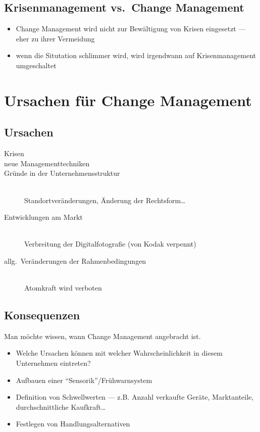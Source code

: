 \documentclass[a4paper, 12pt]{article}
\begin{document}
\subsection{Krisenmanagement vs.\ Change Management}
\begin{itemize}
  \item Change Management wird nicht zur Bewältigung von Krisen eingesetzt --- eher zu ihrer Vermeidung
  \item wenn die Situtation schlimmer wird, wird irgendwann auf Krisenmanagement umgeschaltet
\end{itemize}


\section[Ursachen]{Ursachen für Change Management}


\subsection{Ursachen}
\begin{description}
  \item[Krisen]
  \item[neue Managementtechniken]
  \item[Gründe in der Unternehmensstruktur]~\\Standortveränderungen, Änderung der Rechtsform\ldots
  \item[Entwicklungen am Markt]~\\Verbreitung der Digitalfotografie (von Kodak verpennt)
  \item[allg.\ Veränderungen der Rahmenbedingungen]~\\Atomkraft wird verboten
\end{description}


\subsection{Konsequenzen}
Man möchte wissen, wann Change Management angebracht ist.
\begin{itemize}
  \item Welche Ursachen können mit welcher Wahrscheinlichkeit in diesem Unternehmen eintreten?
  \item Aufbauen einer ``Sensorik''/Frühwarnsystem
  \item Definition von Schwellwerten --- z.B. Anzahl verkaufte Geräte, Marktanteile, durchschnittliche Kaufkraft\ldots
  \item Festlegen von Handlungsalternativen
\end{itemize}
\end{document}
